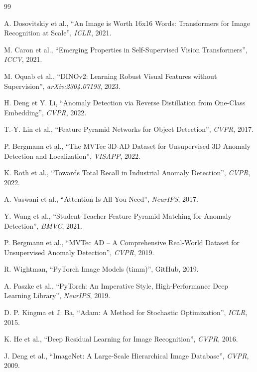 \documentclass[12pt,a4paper,oneside]{report}
\begin{document}
\begin{thebibliography}{99}

A. Dosovitskiy et al., ``An Image is Worth 16x16 Words: Transformers for Image Recognition at Scale'', \textit{ICLR}, 2021.

M. Caron et al., ``Emerging Properties in Self-Supervised Vision Transformers'', \textit{ICCV}, 2021.

M. Oquab et al., ``DINOv2: Learning Robust Visual Features without Supervision'', \textit{arXiv:2304.07193}, 2023.

H. Deng et Y. Li, ``Anomaly Detection via Reverse Distillation from One-Class Embedding'', \textit{CVPR}, 2022.

T.-Y. Lin et al., ``Feature Pyramid Networks for Object Detection'', \textit{CVPR}, 2017.

P. Bergmann et al., ``The MVTec 3D-AD Dataset for Unsupervised 3D Anomaly Detection and Localization'', \textit{VISAPP}, 2022.

K. Roth et al., ``Towards Total Recall in Industrial Anomaly Detection'', \textit{CVPR}, 2022.

A. Vaswani et al., ``Attention Is All You Need'', \textit{NeurIPS}, 2017.

Y. Wang et al., ``Student-Teacher Feature Pyramid Matching for Anomaly Detection'', \textit{BMVC}, 2021.

P. Bergmann et al., ``MVTec AD -- A Comprehensive Real-World Dataset for Unsupervised Anomaly Detection'', \textit{CVPR}, 2019.

R. Wightman, ``PyTorch Image Models (timm)'', GitHub, 2019.

A. Paszke et al., ``PyTorch: An Imperative Style, High-Performance Deep Learning Library'', \textit{NeurIPS}, 2019.

D. P. Kingma et J. Ba, ``Adam: A Method for Stochastic Optimization'', \textit{ICLR}, 2015.

K. He et al., ``Deep Residual Learning for Image Recognition'', \textit{CVPR}, 2016.

J. Deng et al., ``ImageNet: A Large-Scale Hierarchical Image Database'', \textit{CVPR}, 2009.

\end{thebibliography}
\end{document}
